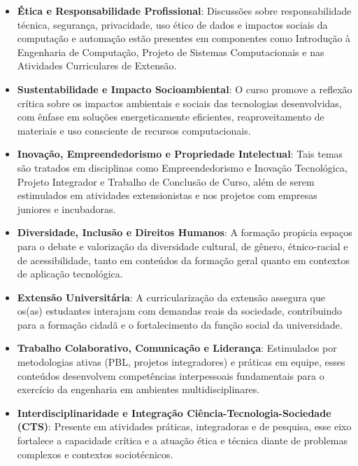 \begin{itemize}
\item \textbf{Ética e Responsabilidade Profissional}: Discussões sobre responsabilidade técnica, segurança, privacidade, uso ético de dados e impactos sociais da computação e automação estão presentes em componentes como Introdução à Engenharia de Computação, Projeto de Sistemas Computacionais e nas Atividades Curriculares de Extensão.

\item \textbf{Sustentabilidade e Impacto Socioambiental}: O curso promove a reflexão crítica sobre os impactos ambientais e sociais das tecnologias desenvolvidas, com ênfase em soluções energeticamente eficientes, reaproveitamento de materiais e uso consciente de recursos computacionais.

\item \textbf{Inovação, Empreendedorismo e Propriedade Intelectual}: Tais temas são tratados em disciplinas como Empreendedorismo e Inovação Tecnológica, Projeto Integrador e Trabalho de Conclusão de Curso, além de serem estimulados em atividades extensionistas e nos projetos com empresas juniores e incubadoras.

\item \textbf{Diversidade, Inclusão e Direitos Humanos}: A formação propicia espaços para o debate e valorização da diversidade cultural, de gênero, étnico-racial e de acessibilidade, tanto em conteúdos da formação geral quanto em contextos de aplicação tecnológica.

\item \textbf{Extensão Universitária}: A curricularização da extensão assegura que os(as) estudantes interajam com demandas reais da sociedade, contribuindo para a formação cidadã e o fortalecimento da função social da universidade.

\item \textbf{Trabalho Colaborativo, Comunicação e Liderança}: Estimulados por metodologias ativas (PBL, projetos integradores) e práticas em equipe, esses conteúdos desenvolvem competências interpessoais fundamentais para o exercício da engenharia em ambientes multidisciplinares.

\item \textbf{Interdisciplinaridade e Integração Ciência-Tecnologia-Sociedade (CTS)}: Presente em atividades práticas, integradoras e de pesquisa, esse eixo fortalece a capacidade crítica e a atuação ética e técnica diante de problemas complexos e contextos sociotécnicos.

\end{itemize}

